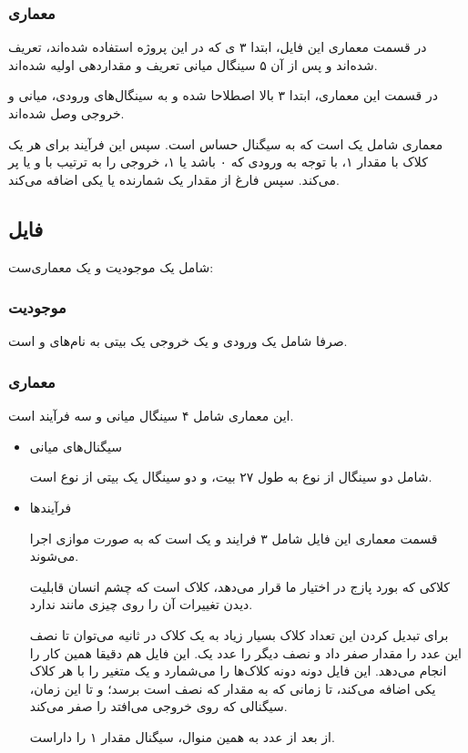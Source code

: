 \documentclass[dvipsnames, svgnames, x11names, a4paper, 11pt]{article}
\begin{document}
\subsubsection{معماری }
در قسمت معماری این فایل، ابتدا ۳ 
ی 
که در این پروژه استفاده شده‌اند، تعریف شده‌اند و پس از آن ۵ سینگال میانی تعریف و مقداردهی اولیه شده‌اند.
 
در قسمت  این معماری، ابتدا ۳  بالا اصطلاحا 
شده و به سینگال‌های ورودی، میانی و خروجی وصل شده‌اند.

معماری شامل یک  است که به سیگنال 
حساس است. سپس این فرآیند برای هر یک کلاک با مقدار ۱، با توجه به ورودی  که ۰ باشد یا ۱، خروجی را به ترتیب با 
و یا
پر می‌کند. سپس فارغ از مقدار  یک شمارنده یا یکی اضافه می‌کند.
\subsection{فایل }
شامل یک موجودیت و یک معماری‌ست:
\subsubsection{موجودیت }
صرفا شامل یک ورودی و یک خروجی یک بیتی به نام‌های 
و 
است.

\subsubsection{معماری }
این معماری شامل ۴ سینگال میانی و سه فرآیند است.

\begin{itemize}
\item 
سیگنال‌های میانی

شامل دو سینگال از نوع
به طول ۲۷ بیت، و دو سینگال یک بیتی از نوع 
است.

\item 
فرآیند‌ها

قسمت معماری این فایل شامل ۳ فرايند و یک 
است که به صورت موازی اجرا می‌شوند.

کلاکی که بورد پازج در اختیار ما قرار می‌دهد، کلاک 
است که چشم انسان قابلیت دیدن تغییرات آن را روی چیزی مانند  ندارد.

برای تبدیل کردن این تعداد کلاک بسیار زیاد به یک کلاک در ثانیه می‌توان تا نصف این عدد را مقدار صفر داد و نصف دیگر را عدد یک. این فایل‌ هم دقیقا همین کار را انجام می‌دهد. این فایل دونه دونه کلاک‌ها را می‌شمارد و یک متغیر را با هر کلاک یکی اضافه می‌کند، تا زمانی که به مقدار 
که نصف 
است برسد؛ و تا این زمان، سیگنالی که روی خروجی می‌افتد را 
صفر می‌کند.

از بعد از عدد 
به همین منوال، سیگنال
مقدار ۱ را داراست.
\end{itemize}
\end{document}
